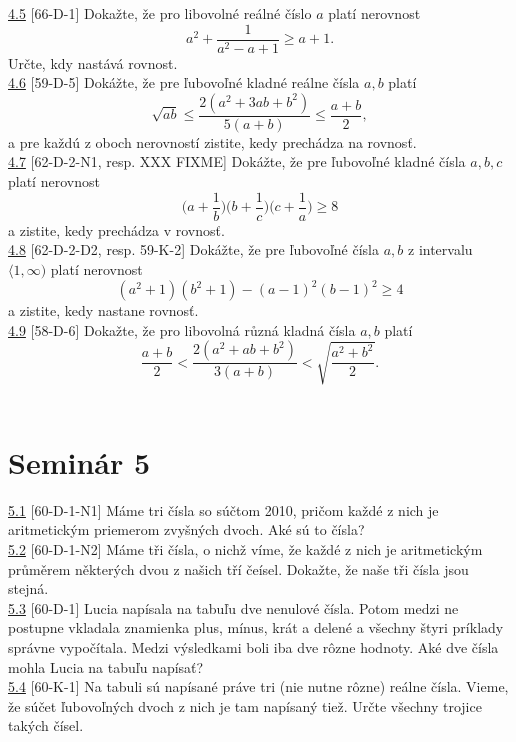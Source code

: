 
\noindent \ul{4.5} [66-D-1] Dokažte, že pro libovolné reálné číslo $a$ platí nerovnost $$a^2+\frac{1}{a^2-a+1}\geq a+1.$$ Určte, kdy nastává rovnost.\\

 
\noindent \ul{4.6} [59-D-5] Dokážte, že pre ľubovoľné kladné reálne čísla $a, b$ platí
$$ \sqrt{ab}\leq \frac{2(a^2+3ab+b^2)}{5(a+b)}\leq \frac{a+b}{2},$$
a pre každú z oboch nerovností zistite, kedy prechádza na rovnosť.\\

 
\noindent \ul{4.7} [62-D-2-N1, resp. XXX FIXME]
Dokážte, že pre ľubovoľné kladné čísla $a, b, c$ platí nerovnost
$$\bigg(a +\frac{1}{b}\bigg)\bigg(b+\frac{1}{c}\bigg)\bigg(c+\frac{1}{a}\bigg)\geq 8$$
a zistite, kedy prechádza v rovnosť.\\

\noindent \ul{4.8} [62-D-2-D2, resp. 59-K-2]
Dokážte, že pre ľubovoľné čísla $a, b$ z intervalu $\langle 1, \infty)$ platí nerovnost
$$ (a^2 + 1)(b^2 + 1) - (a - 1)^2 (b - 1)^2 \geq 4$$
a zistite, kedy nastane rovnosť.\\

\noindent \ul{4.9} [58-D-6]
Dokažte, že pro libovolná různá kladná čísla $a, b$ platí
$$\frac{a+b}{2}<\frac{2(a^2 + ab + b^2 )}{3(a+b)}<\sqrt{\frac{a^2+b^2}{2}}.$$\\

\section*{Seminár 5}

\noindent \ul{5.1} [60-D-1-N1] Máme tri čísla so súčtom 2010, pričom každé z nich je aritmetickým priemerom zvyšných dvoch. Aké sú to čísla?\\

\noindent \ul{5.2} [60-D-1-N2] Máme tři čísla, o nichž víme, že každé z nich je aritmetickým
průměrem některých dvou z našich tří čeísel. Dokažte, že naše tři čísla jsou stejná.\\

\noindent \ul{5.3} [60-D-1]
Lucia napísala na tabuľu dve nenulové čísla. Potom medzi ne postupne vkladala znamienka plus, mínus, krát a delené a všechny štyri príklady správne vypočítala. Medzi výsledkami boli iba dve rôzne hodnoty. Aké dve čísla mohla Lucia na tabuľu napísať?\\

\noindent \ul{5.4} [60-K-1]
Na tabuli sú napísané práve tri (nie nutne rôzne) reálne čísla. Vieme, že súčet ľubovoľných dvoch z nich je tam napísaný tiež. Určte všechny trojice takých čísel.\\

